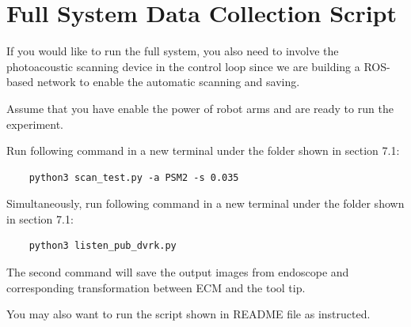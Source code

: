 \section{Full System Data Collection Script}

If you would like to run the full system, you also need to involve the photoacoustic scanning device in the control loop since we are building a ROS-based network to enable the automatic scanning and saving.

Assume that you have enable the power of robot arms and are ready to run the experiment.

Run following command in a new terminal under the folder shown in section 7.1:

\begin{verbatim}
    python3 scan_test.py -a PSM2 -s 0.035
\end{verbatim}

Simultaneously, run following command in a new terminal under the folder shown in section 7.1:

\begin{verbatim}
    python3 listen_pub_dvrk.py
\end{verbatim}

The second command will save the output images from endoscope and corresponding transformation between ECM and the tool tip.

You may also want to run the script shown in README file as instructed.


\clearpage

\printbibliography





